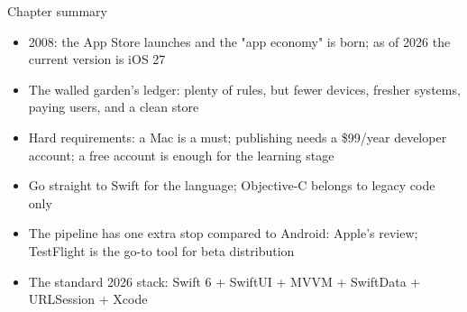 \begin{tcbsummary}{Chapter summary}
\begin{itemize}
  \item 2008: the App Store launches and the "app economy" is born; as of 2026 the current version is iOS 27
  \item The walled garden's ledger: plenty of rules, but fewer devices, fresher systems, paying users, and a clean store
  \item Hard requirements: a Mac is a must; publishing needs a \$99/year developer account; a free account is enough for the learning stage
  \item Go straight to Swift for the language; Objective-C belongs to legacy code only
  \item The pipeline has one extra stop compared to Android: Apple's review; TestFlight is the go-to tool for beta distribution
  \item The standard 2026 stack: Swift 6 + SwiftUI + MVVM + SwiftData + URLSession + Xcode
\end{itemize}

\end{tcbsummary}
